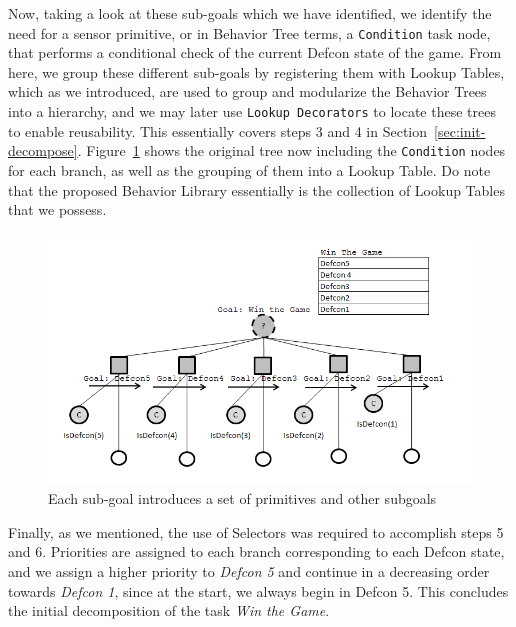         Now, taking a look at these sub-goals which we have identified, we identify the need for a sensor primitive, or in Behavior Tree terms, a \texttt{Condition} task node, that performs a conditional check of the current Defcon state of the game. From here, we group these different sub-goals by registering them with Lookup Tables, which as we introduced, are used to group and modularize the Behavior Trees into a hierarchy, and we may later use  \texttt{Lookup Decorators} to locate these trees to enable reusability. This essentially covers steps 3 and 4 in Section~\ref{sec:init-decompose}. Figure~\ref{img:defnextlevel} shows the original tree now including the \texttt{Condition} nodes for each branch, as well as the grouping of them into a Lookup Table. Do note that the proposed Behavior Library essentially is the collection of Lookup Tables that we possess.
        
        \begin{figure}[h]                
            \begin{center}
            \includegraphics[scale=0.4]{images/defnextlevel.png}
            \caption{Each sub-goal introduces a set of primitives and other subgoals }
            \label{img:defnextlevel}
            \end{center}            
        \end{figure}
        
        Finally, as we mentioned, the use of Selectors was required to accomplish steps 5 and 6. Priorities are assigned to each branch corresponding to each Defcon state, and we assign a higher priority to \emph{Defcon 5} and continue in a decreasing order towards \emph{Defcon 1}, since at the start, we always begin in Defcon 5. This concludes the initial decomposition of the task \emph{Win the Game}. 
        

